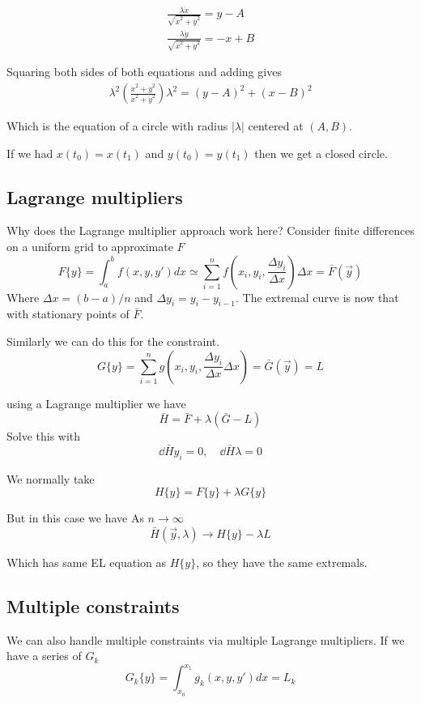 \documentclass{E:/Documents/Latex/myassignment}
\begin{document}
\begin{align*}
	\frac{\lambda \dot x}{\sqrt{\dot x^2 + \dot y^2}} = y - A\\
	\frac{\lambda \dot y}{\sqrt{\dot x^2 + \dot y^2}} = -x + B
\end{align*}

Squaring both sides of both equations and adding gives
\begin{align*}
	\lambda^2\left(\frac{ \dot x^2 + \dot y^2}{\dot x^2 + \dot y^2}\right)
	\lambda^2 = (y-A)^2 + (x-B)^2
\end{align*}

Which is the equation of a circle with radius $|\lambda|$ centered at $(A,B)$.

If we had $x(t_0) = x(t_1)$ and $y(t_0) = y(t_1)$ then we get a closed circle. 

\subsection{Lagrange multipliers}
Why does the Lagrange multiplier approach work here?
Consider finite differences on a uniform grid to approximate $F$
\[F\{y\} = \int_a^b f(x,y,y') dx \simeq \sum_{i=1}^{n} f\left(x_i,y_i,\frac{\Delta y_i}{\Delta x}\right) \Delta x = \bar{F}(\vec y)\]
Where $\Delta x = (b-a)/n$ and $\Delta y_i = y_i - y_{i-1}$. The extremal curve is now that with stationary points of $\bar{F}$.

Similarly we can do this for the constraint.
\[G\{y\} = \sum_{i=1}^n g\left(x_i,y_i, \frac{\Delta y_i}{\Delta x} \Delta x\right) = \bar{G}(\vec y) = L\]

using a Lagrange multiplier we have
\[\bar{H} = \bar{F} + \lambda (\bar{G} - L)\]
Solve this with
\[\dd{\bar{H}}{y_i} = 0, \quad \dd{\bar{H}}{\lambda} = 0\]

We normally take
\[H\{y\} = F\{y\} + \lambda G\{y\}\]

But in this case we have
As $n\to \infty$
\[\bar{H}(\vec y,\lambda) \to H\{y\} - \lambda L\]

Which has same EL equation as $H\{y\}$, so they have the same extremals.



\subsection{Multiple constraints}
We can also handle multiple constraints via multiple Lagrange multipliers. If we have a series of $G_k$
\[G_k\{y\} = \int_{x_0}^{x_1} g_k(x,y,y') dx = L_k\]
\end{document}
